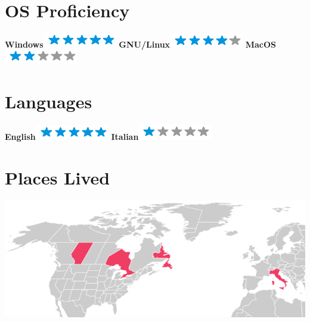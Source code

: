 \documentclass[]{friggeri-cv}
\begin{document}
\begin{aside}
~
~
~
	  \section{OS Proficiency}
    \textbf{Windows}\includegraphics[scale=0.40]{img/5stars.png}
    \textbf{GNU/Linux}\includegraphics[scale=0.40]{img/4stars.png}
    \textbf{MacOS}\includegraphics[scale=0.40]{img/2stars.png}
    ~
    ~
      \section{Languages}
    \textbf{English}\includegraphics[scale=0.40]{img/5stars.png}
    \textbf{Italian}\includegraphics[scale=0.40]{img/1stars.png}
    ~
    ~
  \section{Places Lived}
    \includegraphics[scale=0.12]{img/world.png}
    ~
    ~

\end{aside}
\end{document}
